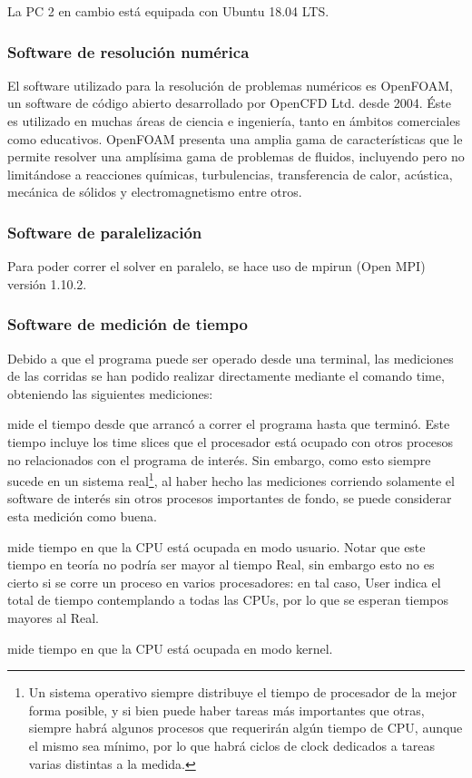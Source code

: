 \documentclass{article}
\begin{document}
La PC 2 en cambio está equipada con Ubuntu 18.04 LTS.

\subsubsection{Software de resolución numérica}
El software utilizado para la resolución de problemas numéricos es OpenFOAM, un software de código abierto desarrollado por OpenCFD Ltd. desde 2004. Éste es utilizado en muchas áreas de ciencia e ingeniería, tanto en ámbitos comerciales como educativos. OpenFOAM presenta una amplia gama de características que le permite resolver una amplísima gama de problemas de fluidos, incluyendo pero no limitándose a reacciones químicas, turbulencias, transferencia de calor, acústica, mecánica de sólidos y electromagnetismo entre otros. 

\subsubsection{Software de paralelización}
Para poder correr el solver en paralelo, se hace uso de mpirun (Open MPI) versión 1.10.2. 

\subsubsection{Software de medición de tiempo}
Debido a que el programa puede ser operado desde una terminal, las mediciones de las corridas se han podido realizar directamente mediante el comando time, obteniendo las siguientes mediciones: 
\begin{description}[align=left]
    \item [Real:] mide el tiempo desde que arrancó a correr el programa hasta que terminó. Este tiempo incluye los time slices que el procesador está ocupado con otros procesos no relacionados con el programa de interés. Sin embargo, como esto siempre sucede en un sistema real\footnote{ Un sistema operativo siempre distribuye el tiempo de procesador de la mejor forma posible, y si bien puede haber tareas más importantes que otras, siempre habrá algunos procesos que requerirán algún tiempo de CPU, aunque el mismo sea mínimo, por lo que habrá ciclos de clock dedicados a tareas varias distintas a la medida.}, al haber hecho las mediciones corriendo solamente el software de interés sin otros procesos importantes de fondo, se puede considerar esta medición como buena.
    \item [User:] mide tiempo en que la CPU está ocupada en modo usuario. Notar que este tiempo en teoría no podría ser mayor al tiempo Real, sin embargo esto no es cierto si se corre un proceso en varios procesadores: en tal caso, User indica el total de tiempo contemplando a todas las CPUs, por lo que se esperan tiempos mayores al Real.
    \item [Sys:] mide tiempo en que la CPU está ocupada en modo kernel.
\end{description}
\end{document}
